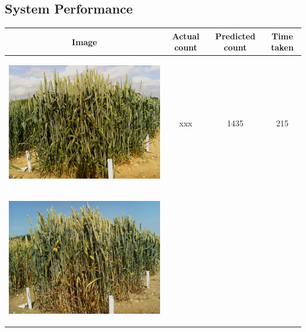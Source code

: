 \subsection{System Performance}
\begin{table}[hp!]
  \centering
  \begin{tabular}{ | c | c | c | c |}
    \hline
    Image & Actual count & Predicted count & Time taken \\ \hline
    \begin{minipage}{.3\textwidth}
      \begin{center}
		\includegraphics[width=\linewidth]{Images/001}
      \end{center}
    \end{minipage}
    &
      xxx
    & 
      1435
    & 
      215
    \\ \hline
    \begin{minipage}{.3\textwidth}
      \begin{center}
		\includegraphics[width=\linewidth]{Images/002}

\end{center}
\end{minipage}
\end{tabular}
\end{table}
